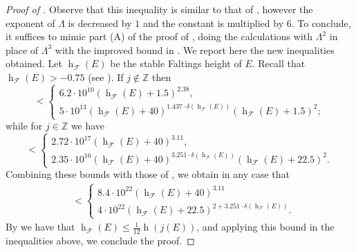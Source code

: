 \documentclass{amsart}
\theoremstyle{definition}
\newcommand{\Z}{\mathbb{Z}}
\newcommand{\GL}{\operatorname{GL}}
\newcommand{\Fheight}{\operatorname{h}_\mathcal{F}}
\numberwithin{theorem}{section}
\numberwithin{equation}{section}
\begin{document}
\begin{proof}[Proof of ]
    Observe that this inequality is similar to that of \cite[Lemma 7.18]{furio24}, however the exponent of $\Lambda$ is decreased by $1$ and the constant is multiplied by $6$.  To conclude, it suffices to mimic part (A) of the proof of \cite[Theorem 7.1]{furio24}, doing the calculations with $\Lambda^2$ in place of $\Lambda^3$ with the improved bound in . 
    We report here the new inequalities obtained. Let $\Fheight(E)$ be the stable Faltings height of $E$. Recall that $\Fheight(E) > -0.75$ (see \cite[Remark 2.4]{furio24}). If $j \notin \Z$ then
    \begin{equation}
    [\GL_2(\widehat{\Z}) : \operatorname{Im}\rho_E] < \begin{cases}
        6.2 \cdot 10^{10} (\Fheight(E)+1.5)^{2.38}, \\
        5 \cdot 10^{13} (\Fheight(E) +40)^{1.437 \cdot \delta(\Fheight(E))} (\Fheight(E) + 1.5)^2;
    \end{cases}
    \end{equation}
    while for $j \in \Z$ we have
    \begin{equation}
        [\GL_2(\widehat{\Z}) : \operatorname{Im}\rho_E] < \begin{cases}
        2.72 \cdot 10^{17} (\Fheight(E) + 40)^{3.11}, \\
        2.35 \cdot 10^{16} (\Fheight(E) +40)^{3.251 \cdot \delta(\Fheight(E))} (\Fheight(E) + 22.5)^2.
    \end{cases}
    \end{equation}
    Combining these bounds with those of , we obtain in any case that
    \begin{align*}
        [\GL_2(\widehat{\Z}) : \operatorname{Im} \rho_E] &< \begin{cases} 8.4 \cdot 10^{22} (\Fheight(E) + 40)^{3.11} \\
		4 \cdot 10^{22} (\Fheight(E) + 22.5)^{2 + 3.251 \cdot \delta(\Fheight(E))}. \end{cases}
    \end{align*}
    By \cite[Theorem 2.3]{furio24} we have that $\Fheight(E) \le \frac{1}{12}\operatorname{h}(j(E))$, and applying this bound in the inequalities above, we conclude the proof.
\end{proof}



\end{document}
